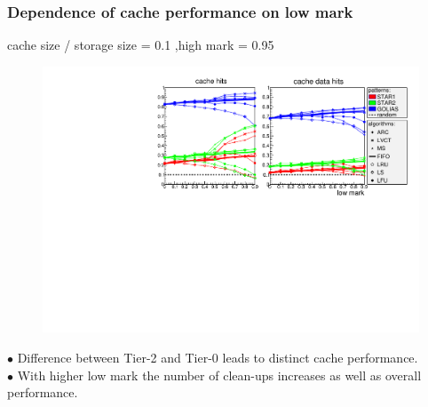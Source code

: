 \documentclass{beamer}
\begin{document}
\begin{frame}\frametitle{Dependence of cache performance on low mark}
\vspace{-0.4cm}
\begin{tiny}	cache size / storage size = 0.1 ,high mark = 0.95 \end{tiny}
\begin{figure}
\vspace{-0.4cm}
	\begin{center}
		\centering
		\includegraphics[width=\textwidth]{pic/low-basic_color.pdf}
	\end{center}
\end{figure}	
\vspace{-0.5cm}
$\bullet $ Difference between Tier-2 and Tier-0 leads to distinct cache performance.\\
$\bullet $ With higher low mark the number of clean-ups increases as well as overall performance.\\
\end{frame}
\end{document}

